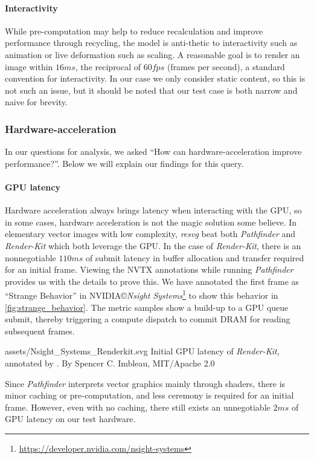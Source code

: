 \paragraph{Interactivity} While pre-computation may help to reduce recalculation and improve performance through recycling, the model is anti-thetic to interactivity such as animation or live deformation such as scaling. A reasonable goal is to render an image within \(16ms\), the reciprocal of \(60fps\) (frames per second), a standard convention for interactivity. In our case we only consider static content, so this is not such an issue, but it should be noted that our test case is both narrow and naive for brevity.

\subsubsection{Hardware-acceleration}
In our questions for analysis, we asked ``How can hardware-acceleration improve performance?''. Below we will explain our findings for this query.\medskip

\paragraph{GPU latency} Hardware acceleration always brings latency when interacting with the GPU, so in some cases, hardware acceleration is not the magic solution some believe. In elementary vector images with low complexity, \textit{resvg} beat both \textit{Pathfinder} and \textit{Render-Kit} which both leverage the GPU. In the case of \textit{Render-Kit}, there is an nonnegotiable \(110ms\) of submit latency in buffer allocation and transfer required for an initial frame. Viewing the NVTX annotations while running \textit{Pathfinder} provides us with the details to prove this. We have annotated the first frame as ``Strange Behavior'' in NVIDIA\copyright \textit{Nsight Systems}\footnote{\href{https://developer.nvidia.com/nsight-systems}{https://developer.nvidia.com/nsight-systems}} to show this behavior in \cref{fig:strange_behavior}. The metric samples show a build-up to a GPU queue submit, thereby triggering a compute dispatch to commit DRAM for reading subsequent frames.\medskip

\widesvg
{assets/Nsight_Systems_Renderkit.svg}
{Initial GPU latency of \textit{Render-Kit}, annotated by \toollinkedname.\label{fig:strange_behavior}}
{By Spencer C. Imbleau, MIT/Apache 2.0}
\medskip

Since \textit{Pathfinder} interprets vector graphics mainly through shaders, there is minor caching or pre-computation, and less ceremony is required for an initial frame. However, even with no caching, there still exists an unnegotiable \(2ms\) of GPU latency on our test hardware.

